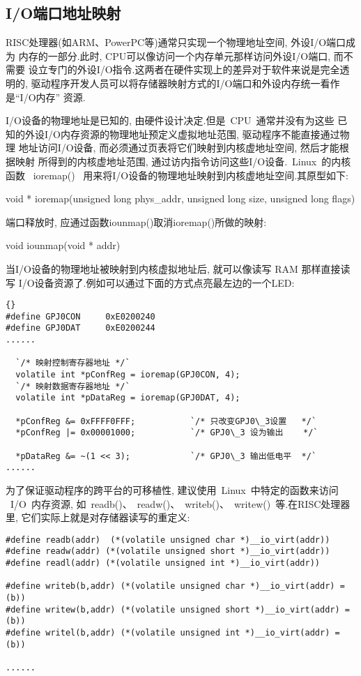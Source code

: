 \subsection{I/O端口地址映射}
	RISC处理器(如ARM、PowerPC等)通常只实现一个物理地址空间, 外设I/O端口成为
内存的一部分.此时, CPU可以像访问一个内存单元那样访问外设I/O端口, 而不需要
设立专门的外设I/O指令.这两者在硬件实现上的差异对于软件来说是完全透明的, 
驱动程序开发人员可以将存储器映射方式的I/O端口和外设内存统一看作是``I/O内存''
资源.

	I/O设备的物理地址是已知的, 由硬件设计决定.但是~CPU~通常并没有为这些
已知的外设I/O内存资源的物理地址预定义虚拟地址范围, 驱动程序不能直接通过物理
地址访问I/O设备, 而必须通过页表将它们映射到内核虚地址空间, 然后才能根据映射
所得到的内核虚地址范围, 通过访内指令访问这些I/O设备.~Linux~的内核函数
~ioremap()~ 用来将I/O设备的物理地址映射到内核虚地址空间.其原型如下:

	void * ioremap(unsigned long phys\_addr, unsigned long size, unsigned long
flags)

	端口释放时, 应通过函数iounmap()取消ioremap()所做的映射:

	void iounmap(void * addr)

	当I/O设备的物理地址被映射到内核虚拟地址后, 就可以像读写 RAM 那样直接读写
I/O设备资源了.例如可以通过下面的方式点亮最左边的一个LED:

\begin{boxedminipage}{.9\textwidth}
\lstset{language=c,escapeinside=``}
\begin{lstlisting}{}
#define	GPJ0CON		0xE0200240
#define	GPJ0DAT		0xE0200244
......

  `/* 映射控制寄存器地址 */`
  volatile int *pConfReg = ioremap(GPJ0CON, 4);
  `/* 映射数据寄存器地址 */`
  volatile int *pDataReg = ioremap(GPJ0DAT, 4);

  *pConfReg &= 0xFFFF0FFF;           `/* 只改变GPJ0\_3设置   */`
  *pConfReg |= 0x00001000;           `/* GPJ0\_3 设为输出    */`

  *pDataReg &= ~(1 << 3);            `/* GPJ0\_3 输出低电平  */`
......
\end{lstlisting}
\end{boxedminipage}
	
	为了保证驱动程序的跨平台的可移植性, 建议使用~Linux~中特定的函数来访问
~I/O~内存资源, 如~readb()、~readw()、~writeb()、~writew()~等.在RISC处理器里, 
它们实际上就是对存储器读写的重定义:

\begin{boxedminipage}{.9\textwidth}
\begin{verbatim}
#define readb(addr)  (*(volatile unsigned char *)__io_virt(addr))
#define readw(addr) (*(volatile unsigned short *)__io_virt(addr))
#define readl(addr) (*(volatile unsigned int *)__io_virt(addr))

#define writeb(b,addr) (*(volatile unsigned char *)__io_virt(addr) = (b))
#define writew(b,addr) (*(volatile unsigned short *)__io_virt(addr) = (b))
#define writel(b,addr) (*(volatile unsigned int *)__io_virt(addr) = (b))

......
\end{verbatim}
\end{boxedminipage}

